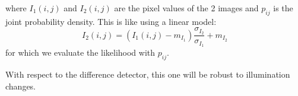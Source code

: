 where $I_1(i,j)$ and $I_2(i,j)$ are the pixel values of the 2 images and
$p_{ij}$ is the joint probability density. This is like using a linear model:
\begin{equation}
I_2(i,j) = (I_1(i,j)-m_{I_1})\frac{\sigma_{I_2}}{\sigma_{I_1}}+m_{I_2}
\end{equation}
for which we evaluate the likelihood with  $p_{ij}$.

With respect to the difference detector, this one will be robust to
illumination changes.











